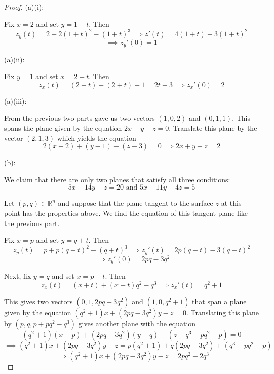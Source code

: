 \documentclass{article}
\theoremstyle{plain} %
\numberwithin{thm}{section} %
\theoremstyle{definition}
\begin{document}
        \begin{proof}
            (a)(i):

            Fix \(x = 2\) and set \(y = 1+t\). Then
            \[
                z_y(t) = 2 + 2(1+t)^2 - (1+t)^3 \implies z'(t) = 4(1+t) - 3(1+t)^2
            \]
            \[
                \implies z_y'(0) = 1
            \]

            \medskip

            (a)(ii):

            Fix \(y = 1\) and set \(x = 2 + t\). Then
            \[
                z_x(t) = (2+t) + (2+t) - 1 = 2t + 3 \implies z_x'(0) = 2
            \]

            \medskip

            (a)(iii):

            From the previous two parts gave us two vectors \((1,0,2)\) and \((0,1,1)\). This spans the plane given by the equation \(2x+y-z = 0\). Translate this plane by the vector \((2,1,3)\) which yields the equation
            \[
                2(x-2)+(y-1)-(z-3) = 0 \implies 2x+y-z=2
            \]
            \medbreak

            (b):

            We claim that there are only two planes that satisfy all three conditions:
            \[
                5x - 14y - z = 20 \text{ and } 5x - 11y - 4z = 5
            \]

            Let \((p,q) \in \mathbb{R}^n\) and suppose that the plane tangent to the surface \(z\) at this point has the properties above. We find the equation of this tangent plane like the previous part.

            Fix \(x = p\) and set \(y = q + t\). Then
            \[
                z_y(t) = p + p(q+t)^2 - (q+t)^3 \implies z_y'(t) = 2p(q+t) - 3(q+t)^2
            \]
            \[
                \implies z_y'(0) = 2pq - 3q^2
            \]

            Next, fix \(y = q\) and set \(x = p + t\). Then
            \[
                z_x(t) = (x+t) + (x+t)q^2 - q^3 \implies z_x'(t) = q^2 + 1
            \]

            This gives two vectors \((0, 1, 2pq - 3q^2)\) and \((1,0,q^2 + 1)\) that span a plane given by the equation \((q^2 + 1)x + (2pq - 3q^2)y - z = 0\). Translating this plane by \((p,q,p+pq^2 - q^3)\) gives another plane with the equation
            \[
                (q^2 + 1)(x-p) + (2pq - 3q^2)(y-q) - (z + q^3 - pq^2 - p) = 0
            \]
            \[
                \implies (q^2 + 1)x + (2pq - 3q^2)y - z = p(q^2 + 1) + q(2pq - 3q^2) + (q^3 - pq^2 - p)
            \]
            \[
                \implies (q^2 + 1)x + (2pq - 3q^2)y - z = 2pq^2 - 2q^3
            \]


\end{proof}
\end{document}
